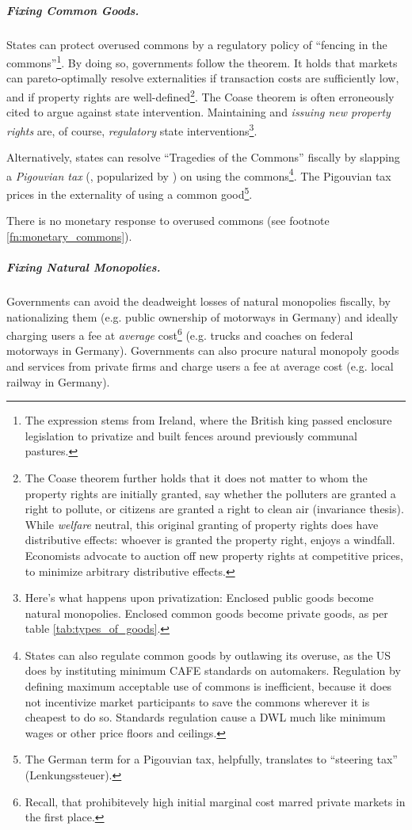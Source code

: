 \subparagraph{Fixing Common Goods.}  \label{sec:common_good_response} States can protect overused commons by a regulatory policy of ``fencing in the commons''\footnote{
	The expression stems from Ireland, where the British king passed enclosure legislation to privatize and built fences around previously communal pastures.}. 
By doing so, governments follow the \cite{Coase1960} theorem. It holds that markets can pareto-optimally resolve externalities if transaction costs are sufficiently low, and if property rights are well-defined\footnote{
	The Coase theorem further holds that it does not matter to whom the property rights are initially granted, say whether the polluters are granted a right to pollute, or citizens are granted a right to clean air (invariance thesis). While \emph{welfare} neutral, this original granting of property rights does have distributive effects: whoever is granted the property right, enjoys a windfall. Economists advocate to auction off new property rights at competitive prices, to minimize arbitrary distributive effects.}.%
The Coase theorem is often erroneously cited to argue against state intervention. Maintaining and \emph{issuing new property rights} are, of course, \emph{regulatory} state interventions\footnote{
	Here's what happens upon privatization: Enclosed public goods become natural monopolies. Enclosed common goods become private goods, as per table \ref{tab:types_of_goods}.}.

Alternatively, states can resolve ``Tragedies of the Commons'' \citep{Hardin-1968-aa} fiscally by slapping a \emph{Pigouvian tax} (\citealt{Pigou1912}, popularized by \citealt{Baumol1972}) on using the commons\footnote{
	States can also regulate common goods by outlawing its overuse, as the US does by instituting minimum \gls{CAFE} standards on automakers. Regulation by defining maximum acceptable use of commons is inefficient, because it does not incentivize market participants to save the commons wherever it is cheapest to do so. Standards regulation cause a \gls{DWL} much like minimum wages or other price floors and ceilings.}. 
The Pigouvian tax prices in the externality of using a common good\footnote{
	The German term for a Pigouvian tax, helpfully, translates to ``steering tax'' (Lenkungssteuer).}. 

There is no monetary response to overused commons (see footnote \ref{fn:monetary_commons}).

\subparagraph{Fixing Natural Monopolies.}  \label{sec:natural_monopoly_response} Governments can avoid the deadweight losses of natural monopolies fiscally, by nationalizing them (e.g. public ownership of motorways in Germany) and ideally charging users a fee at \emph{average} cost\footnote{\label{fn:why_ac_fees}
	Recall, that prohibitevely high initial marginal cost marred private markets in the first place.} 
(e.g. trucks and coaches on federal motorways in Germany). Governments can also procure natural monopoly goods and services from private firms and charge users a fee at average cost (e.g. local railway in Germany).
		
